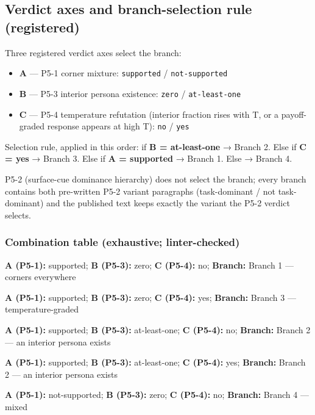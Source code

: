 \documentclass[11pt]{article}
\providecommand{\tightlist}{\setlength{\itemsep}{0pt}\setlength{\parskip}{0pt}}
\begin{document}
\subsection{Verdict axes and branch-selection rule
(registered)}\label{verdict-axes-and-branch-selection-rule-registered}

Three registered verdict axes select the branch:

\begin{itemize}
\tightlist
\item
  \textbf{A} --- P5-1 corner mixture: \texttt{supported} /
  \texttt{not-supported}
\item
  \textbf{B} --- P5-3 interior persona existence: \texttt{zero} /
  \texttt{at-least-one}
\item
  \textbf{C} --- P5-4 temperature refutation (interior fraction rises
  with T, or a payoff-graded response appears at high T): \texttt{no} /
  \texttt{yes}
\end{itemize}

Selection rule, applied in this order: if \textbf{B = at-least-one} →
Branch 2. Else if \textbf{C = yes} → Branch 3. Else if \textbf{A =
supported} → Branch 1. Else → Branch 4.

P5-2 (surface-cue dominance hierarchy) does not select the branch; every
branch contains both pre-written P5-2 variant paragraphs (task-dominant
/ not task-dominant) and the published text keeps exactly the variant
the P5-2 verdict selects.

\subsubsection{Combination table (exhaustive;
linter-checked)}\label{combination-table-exhaustive-linter-checked}

\textbf{A (P5-1):} supported; \textbf{B (P5-3):} zero; \textbf{C
(P5-4):} no; \textbf{Branch:} Branch 1 --- corners everywhere

\textbf{A (P5-1):} supported; \textbf{B (P5-3):} zero; \textbf{C
(P5-4):} yes; \textbf{Branch:} Branch 3 --- temperature-graded

\textbf{A (P5-1):} supported; \textbf{B (P5-3):} at-least-one; \textbf{C
(P5-4):} no; \textbf{Branch:} Branch 2 --- an interior persona exists

\textbf{A (P5-1):} supported; \textbf{B (P5-3):} at-least-one; \textbf{C
(P5-4):} yes; \textbf{Branch:} Branch 2 --- an interior persona exists

\textbf{A (P5-1):} not-supported; \textbf{B (P5-3):} zero; \textbf{C
(P5-4):} no; \textbf{Branch:} Branch 4 --- mixed
\end{document}
